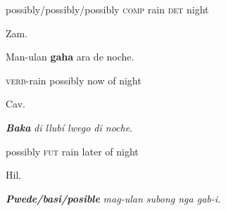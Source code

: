 \begin{stylelsIMT}
possibly/possibly/possibly \textsc{comp} rain \textsc{det} night
\end{stylelsIMT}

\begin{listWWNumiileveli}
\item 
\begin{listWWNumiilevelii}
\item 
\begin{stylelsLanginfo}
Zam.
\end{stylelsLanginfo}
\end{listWWNumiilevelii}
\end{listWWNumiileveli}
\begin{stylelsSourceline}
Man-ulan \textbf{gaha} ara de noche.
\end{stylelsSourceline}

\begin{stylelsIMT}
\textsc{verb}{}-rain possibly now of night
\end{stylelsIMT}

\begin{listWWNumiileveli}
\item 
\begin{listWWNumiilevelii}
\item 
\begin{stylelsLanginfo}
Cav.
\end{stylelsLanginfo}
\end{listWWNumiilevelii}
\end{listWWNumiileveli}
\begin{stylelsIMT}
\textbf{\textit{Baka}}\textit{ di llubí lwego di noche.}
\end{stylelsIMT}

\begin{stylelsIMT}
possibly \textsc{fut} rain later of night
\end{stylelsIMT}

\begin{listWWNumiileveli}
\item 
\begin{listWWNumiilevelii}
\item 
\begin{stylelsLanginfo}
Hil.
\end{stylelsLanginfo}
\end{listWWNumiilevelii}
\end{listWWNumiileveli}
\begin{stylelsIMT}
\textbf{\textit{Pwede/basi/posible}}\textit{ mag-ulan subong nga gab-i.}
\end{stylelsIMT}

